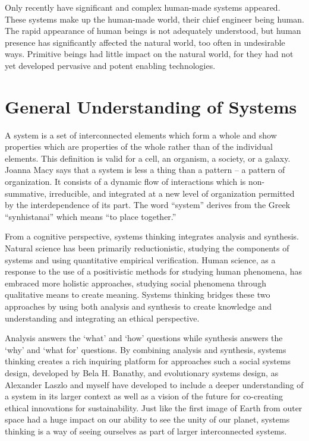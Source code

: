 Only recently have significant and complex human-made systems appeared. These systems make up the human-made world, their chief engineer being human. The rapid appearance of human beings is not adequately understood, but human presence has significantly affected the natural world, too often in undesirable ways. Primitive beings had little impact on the natural world, for they had not yet developed pervasive and potent enabling technologies.


\section{General Understanding of Systems}\label{sec:generalUnderstandingSystems}

A system is a set of interconnected elements which form a whole and show properties which are properties of the whole rather than of the individual elements. This definition is valid for a cell, an organism, a society, or a galaxy. Joanna Macy says that a system is less a thing than a pattern – a pattern of organization. It consists of a dynamic flow of interactions which is non-summative, irreducible, and integrated at a new level of organization permitted by the interdependence of its part. The word “system” derives from the Greek “synhistanai” which means “to place together.”

From a cognitive perspective, systems thinking integrates analysis and synthesis. Natural science has been primarily reductionistic, studying the components of systems and using quantitative empirical verification. Human science, as a response to the use of a positivistic methods for studying human phenomena, has embraced more holistic approaches, studying social phenomena through qualitative means to create meaning. Systems thinking bridges these two approaches by using both analysis and synthesis to create knowledge and understanding and integrating an ethical perspective.

Analysis answers the ‘what’ and ‘how’ questions while synthesis answers the ‘why’ and ‘what for’ questions. By combining analysis and synthesis, systems thinking creates a rich inquiring platform for approaches such a social systems design, developed by Bela H. Banathy, and evolutionary systems design, as Alexander Laszlo and myself have developed to include a deeper understanding of a system in its larger context as well as a vision of the future for co-creating ethical innovations for sustainability. Just like the first image of Earth from outer space had a huge impact on our ability to see the unity of our planet, systems thinking is a way of seeing ourselves as part of larger interconnected systems.

